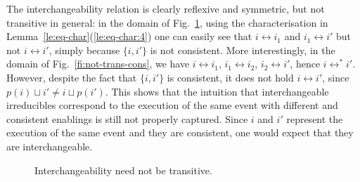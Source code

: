 \documentclass[conference]{IEEEtran}
\newcommand{\pred}[1]{\ensuremath{\mathit{p}({#1})}}
\begin{document}
The interchangeability relation is clearly reflexive and symmetric, but not
transitive in general: in the domain of Fig.~\ref{fi:not-trans}, using the characterisation in Lemma~\ref{le:eq-char}(\ref{le:eq-char:4}) one can easily see that
$i \leftrightarrow i_1$ and $i_1 \leftrightarrow i'$ but not
$i \leftrightarrow i'$, simply because
$\{i, i'\}$ is not consistent.
%
More interestingly, in the domain of Fig.~\ref{fi:not-trans-cons}, we have $i \leftrightarrow i_1$, $i_1 \leftrightarrow i_2$, $i_2 \leftrightarrow i'$, hence $i \leftrightarrow^* i'$. However, despite the fact that $\{i, i'\}$ is consistent, it does not hold $i \leftrightarrow i'$, since $\pred{i} \sqcup i' \neq i \sqcup \pred{i'}$. 
%
This shows that the intuition that
interchangeable irreducibles correspond to the execution of the
same event with different and consistent enablings is still not properly captured. Since $i$ and $i'$ represent the execution of the same event and they are consistent, one would expect that they are interchangeable.



\begin{figure}
  \begin{center}
  \end{center}
  
\caption{Interchangeability need not be transitive.}
\label{fi:not-trans}
\end{figure}
\end{document}
